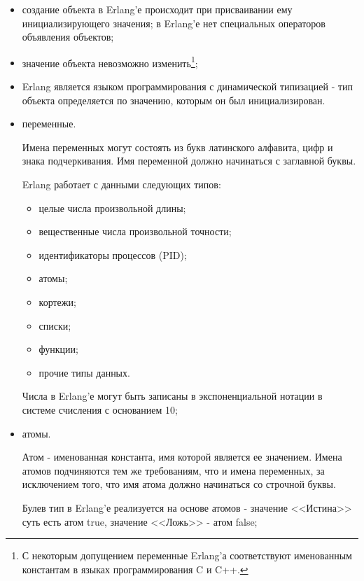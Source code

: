 \begin{itemize}

	\item создание объекта в Erlang'е происходит при присваивании ему инициализирующего значения; в Erlang'е нет специальных операторов объявления объектов;
	\item значение объекта невозможно изменить\footnote{С некоторым допущением переменные Erlang'а соответствуют именованным константам в языках программирования C и C++.};
	\item Erlang является языком программирования с динамической типизацией - тип объекта определяется по значению, которым он был инициализирован.

\end{itemize}

\begin{itemize}

	\item переменные.

		Имена переменных могут состоять из букв латинского алфавита, цифр и знака подчеркивания. Имя переменной должно начинаться с заглавной буквы.

		Erlang работает с данными следующих типов:

		\begin{itemize}

			\item целые числа произвольной длины;
			\item вещественные числа произвольной точности;
			\item идентификаторы процессов (PID);
			\item атомы;
			\item кортежи;
			\item списки;
			\item функции;
			\item прочие типы данных.

		\end{itemize}

		Числа в Erlang'е могут быть записаны в экспоненциальной нотации в системе счисления с основанием 10;

	\item атомы.

		Атом - именованная константа, имя которой является ее значением. Имена атомов подчиняются тем же требованиям, что и имена переменных, за исключением того, что имя атома должно начинаться со строчной буквы.

		Булев тип в Erlang'е реализуется на основе атомов - значение <<Истина>> суть есть атом true, значение <<Ложь>> - атом false;


\end{itemize}
